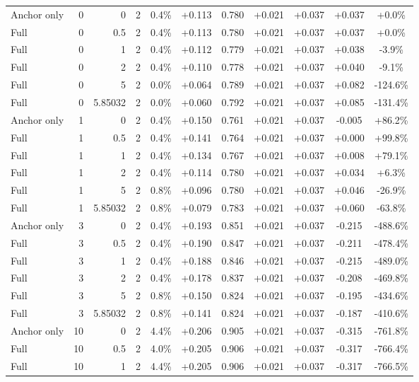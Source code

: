 \begin{table}[htbp]
\begin{tabular}{lrrrccccccc}
Anchor only & 0 & 0 & 2 & 0.4\% & +0.113 & 0.780 & +0.021 & +0.037 & +0.037 & +0.0\% \\
Full & 0 & 0.5 & 2 & 0.4\% & +0.113 & 0.780 & +0.021 & +0.037 & +0.037 & +0.0\% \\
Full & 0 & 1 & 2 & 0.4\% & +0.112 & 0.779 & +0.021 & +0.037 & +0.038 & -3.9\% \\
Full & 0 & 2 & 2 & 0.4\% & +0.110 & 0.778 & +0.021 & +0.037 & +0.040 & -9.1\% \\
Full & 0 & 5 & 2 & 0.0\% & +0.064 & 0.789 & +0.021 & +0.037 & +0.082 & -124.6\% \\
Full & 0 & 5.85032 & 2 & 0.0\% & +0.060 & 0.792 & +0.021 & +0.037 & +0.085 & -131.4\% \\
Anchor only & 1 & 0 & 2 & 0.4\% & +0.150 & 0.761 & +0.021 & +0.037 & -0.005 & +86.2\% \\
Full & 1 & 0.5 & 2 & 0.4\% & +0.141 & 0.764 & +0.021 & +0.037 & +0.000 & +99.8\% \\
Full & 1 & 1 & 2 & 0.4\% & +0.134 & 0.767 & +0.021 & +0.037 & +0.008 & +79.1\% \\
Full & 1 & 2 & 2 & 0.4\% & +0.114 & 0.780 & +0.021 & +0.037 & +0.034 & +6.3\% \\
Full & 1 & 5 & 2 & 0.8\% & +0.096 & 0.780 & +0.021 & +0.037 & +0.046 & -26.9\% \\
Full & 1 & 5.85032 & 2 & 0.8\% & +0.079 & 0.783 & +0.021 & +0.037 & +0.060 & -63.8\% \\
Anchor only & 3 & 0 & 2 & 0.4\% & +0.193 & 0.851 & +0.021 & +0.037 & -0.215 & -488.6\% \\
Full & 3 & 0.5 & 2 & 0.4\% & +0.190 & 0.847 & +0.021 & +0.037 & -0.211 & -478.4\% \\
Full & 3 & 1 & 2 & 0.4\% & +0.188 & 0.846 & +0.021 & +0.037 & -0.215 & -489.0\% \\
Full & 3 & 2 & 2 & 0.4\% & +0.178 & 0.837 & +0.021 & +0.037 & -0.208 & -469.8\% \\
Full & 3 & 5 & 2 & 0.8\% & +0.150 & 0.824 & +0.021 & +0.037 & -0.195 & -434.6\% \\
Full & 3 & 5.85032 & 2 & 0.8\% & +0.141 & 0.824 & +0.021 & +0.037 & -0.187 & -410.6\% \\
Anchor only & 10 & 0 & 2 & 4.4\% & +0.206 & 0.905 & +0.021 & +0.037 & -0.315 & -761.8\% \\
Full & 10 & 0.5 & 2 & 4.0\% & +0.205 & 0.906 & +0.021 & +0.037 & -0.317 & -766.4\% \\
Full & 10 & 1 & 2 & 4.4\% & +0.205 & 0.906 & +0.021 & +0.037 & -0.317 & -766.5\% \\

\end{tabular}
\end{table}

